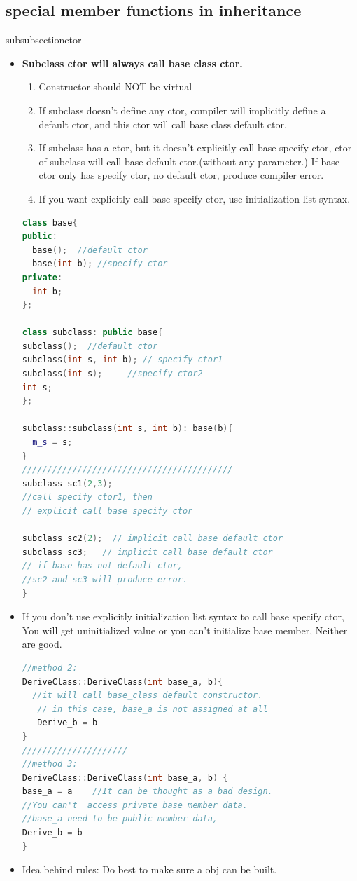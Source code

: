\documentclass[a4paper,12pt,twoside]{book}
\begin{document}
\subsection{special member functions in inheritance}

subsubsection{ctor}
\begin{itemize}

\item  \textbf{Subclass ctor will always call base class ctor.}

\begin{enumerate}
\item Constructor should NOT be virtual
\item If subclass doesn't define any ctor, compiler will implicitly define a default ctor, and this ctor will call base class default ctor.
\item If subclass has a ctor, but it doesn't explicitly call base specify ctor, ctor of subclass will call base default ctor.(without any parameter.) If base ctor only has specify ctor, no default ctor, produce compiler error.
\item If you want explicitly call base specify ctor, use initialization list syntax.

\end{enumerate}

\begin{lstlisting}[frame=single, language=c++]
class base{
public:
  base();  //default ctor
  base(int b); //specify ctor
private:
  int b;
};

class subclass: public base{
subclass();  //default ctor
subclass(int s, int b); // specify ctor1
subclass(int s);     //specify ctor2
int s;
};

subclass::subclass(int s, int b): base(b){
  m_s = s;
}
//////////////////////////////////////////
subclass sc1(2,3);
//call specify ctor1, then
// explicit call base specify ctor

subclass sc2(2);  // implicit call base default ctor
subclass sc3;   // implicit call base default ctor
// if base has not default ctor,
//sc2 and sc3 will produce error.
}
\end{lstlisting}
\item If you don't use  explicitly initialization list syntax to call base specify ctor, You will get uninitialized value or you can't initialize base member, Neither are good.
\begin{lstlisting}[frame=single, language=c++]
//method 2:
DeriveClass::DeriveClass(int base_a, b){
  //it will call base_class default constructor.
   // in this case, base_a is not assigned at all
   Derive_b = b
}	
/////////////////////
//method 3:
DeriveClass::DeriveClass(int base_a, b) {
base_a = a    //It can be thought as a bad design.
//You can't  access private base member data.
//base_a need to be public member data,
Derive_b = b
}
\end{lstlisting}

\item Idea behind rules: Do best to make sure a obj can be built.

\end{itemize}
\end{document}
